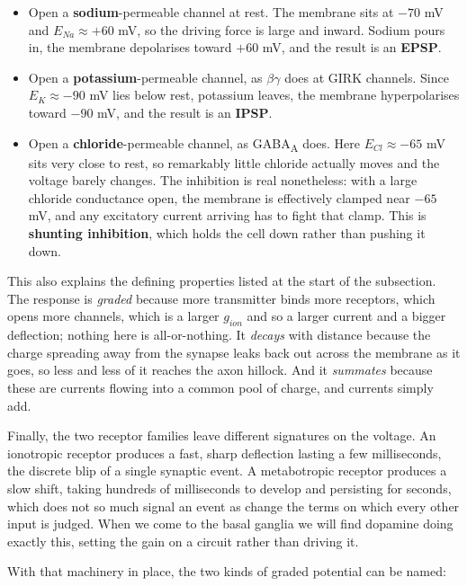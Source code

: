 \documentclass[11pt]{article}
\begin{document}
\begin{itemize}
    \item Open a \textbf{sodium}-permeable channel at rest. The membrane sits at $-70$ mV and $E_{Na} \approx +60$ mV, so the driving force is large and inward. Sodium pours in, the membrane depolarises toward $+60$ mV, and the result is an \textbf{EPSP}.
    \item Open a \textbf{potassium}-permeable channel, as $\beta\gamma$ does at GIRK channels. Since $E_K \approx -90$ mV lies below rest, potassium leaves, the membrane hyperpolarises toward $-90$ mV, and the result is an \textbf{IPSP}.
    \item Open a \textbf{chloride}-permeable channel, as GABA\textsubscript{A} does. Here $E_{Cl} \approx -65$ mV sits very close to rest, so remarkably little chloride actually moves and the voltage barely changes. The inhibition is real nonetheless: with a large chloride conductance open, the membrane is effectively clamped near $-65$ mV, and any excitatory current arriving has to fight that clamp. This is \textbf{shunting inhibition}, which holds the cell down rather than pushing it down.
\end{itemize}

This also explains the defining properties listed at the start of the subsection. The response is \textit{graded} because more transmitter binds more receptors, which opens more channels, which is a larger $g_{ion}$ and so a larger current and a bigger deflection; nothing here is all-or-nothing. It \textit{decays} with distance because the charge spreading away from the synapse leaks back out across the membrane as it goes, so less and less of it reaches the axon hillock. And it \textit{summates} because these are currents flowing into a common pool of charge, and currents simply add.

Finally, the two receptor families leave different signatures on the voltage. An ionotropic receptor produces a fast, sharp deflection lasting a few milliseconds, the discrete blip of a single synaptic event. A metabotropic receptor produces a slow shift, taking hundreds of milliseconds to develop and persisting for seconds, which does not so much signal an event as change the terms on which every other input is judged. When we come to the basal ganglia we will find dopamine doing exactly this, setting the gain on a circuit rather than driving it.

With that machinery in place, the two kinds of graded potential can be named:
\end{document}
